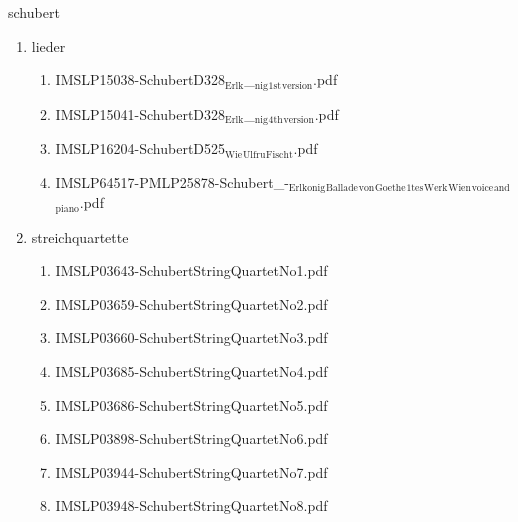 \documentclass[11pt]{article}
\begin{document}
\item schubert
\label{sec-1-1-1-1-44-60}
\begin{enumerate}
\item lieder
\label{sec-1-1-1-1-44-60-1}
\begin{enumerate}
\item IMSLP15038-SchubertD328$_{\text{Erlk}}$\_$_{\text{nig}}$$_{\text{1st}}$$_{\text{version}}$.pdf
\label{sec-1-1-1-1-44-60-1-1}

\item IMSLP15041-SchubertD328$_{\text{Erlk}}$\_$_{\text{nig}}$$_{\text{4th}}$$_{\text{version}}$.pdf
\label{sec-1-1-1-1-44-60-1-2}

\item IMSLP16204-SchubertD525$_{\text{Wie}}$$_{\text{Ulfru}}$$_{\text{Fischt}}$.pdf
\label{sec-1-1-1-1-44-60-1-3}

\item IMSLP64517-PMLP25878-Schubert\_-$_{\text{Erlkonig}}$$_{\text{Ballade}}$$_{\text{von}}$$_{\text{Goethe}}$$_{\text{1tes}}$$_{\text{Werk}}$$_{\text{Wien}}$$_{\text{voice}}$$_{\text{and}}$$_{\text{piano}}$.pdf
\label{sec-1-1-1-1-44-60-1-4}
\end{enumerate}

\item streichquartette
\label{sec-1-1-1-1-44-60-2}
\begin{enumerate}
\item IMSLP03643-SchubertStringQuartetNo1.pdf
\label{sec-1-1-1-1-44-60-2-1}

\item IMSLP03659-SchubertStringQuartetNo2.pdf
\label{sec-1-1-1-1-44-60-2-2}

\item IMSLP03660-SchubertStringQuartetNo3.pdf
\label{sec-1-1-1-1-44-60-2-3}

\item IMSLP03685-SchubertStringQuartetNo4.pdf
\label{sec-1-1-1-1-44-60-2-4}

\item IMSLP03686-SchubertStringQuartetNo5.pdf
\label{sec-1-1-1-1-44-60-2-5}

\item IMSLP03898-SchubertStringQuartetNo6.pdf
\label{sec-1-1-1-1-44-60-2-6}

\item IMSLP03944-SchubertStringQuartetNo7.pdf
\label{sec-1-1-1-1-44-60-2-7}

\item IMSLP03948-SchubertStringQuartetNo8.pdf
\label{sec-1-1-1-1-44-60-2-8}


\end{enumerate}
\end{enumerate}
\end{document}
